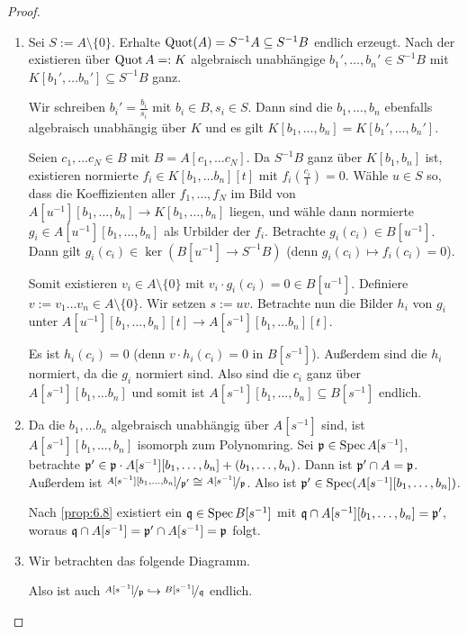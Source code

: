 \documentclass[12pt,a4paper]{scrartcl}
\theoremstyle{cplain}
\theoremstyle{cdef}
\begin{document}
\begin{proof}
	\leavevmode
	\begin{enumerate}[label=\ref{kor:7.17:\roman*}]
		\item Sei $S := A \setminus \{0\}$. Erhalte $\operatorname{Quot}(A)=S^{-1}A \subseteq S^{-1}B$ endlich erzeugt. Nach der  existieren über $\operatorname{Quot} A =: K$ algebraisch unabhängige $b_1',\dots , b_n' \in S^{-1}B$ mit $K[b_1', \dots b_n'] \subseteq S^{-1}B$ ganz. 
		
		Wir schreiben $b_i'=\frac{b_i}{s_i}$ mit $b_i \in B,s_i \in S$. Dann sind die $b_1, \dots , b_n$ ebenfalls algebraisch unabhängig über $K$ und es gilt $K[b_1, \dots , b_n] = K[b_1', \dots , b_n']$.
		
		Seien $c_1, \dots c_N \in B$ mit $B=A[c_1, \dots c_N]$. Da $S^{-1}B$ ganz über $K[b_1, b_n]$ ist, existieren normierte $f_i \in K[b_1, \dots b_n][t]$ mit $f_i(\frac{c_i}{1})=0$. Wähle $u \in S$ so, dass die Koeffizienten aller $f_1, \dots , f_N$ im Bild von $A[u^{-1}][b_1, \dots , b_n] \to K[b_1, \dots , b_n]$ liegen, und wähle dann normierte $g_i \in A[u^{-1}][b_1, \dots , b_n]$ als Urbilder der $f_i$. Betrachte $g_i(c_i) \in B[u^{-1}]$. Dann gilt $g_i(c_i) \in \ker(B[u^{-1}] \to S^{-1}B)$ (denn $g_i(c_i) \mapsto f_i(c_i)=0$). 
		
		Somit existieren $v_i \in A \setminus \{0\}$ mit $v_i \cdot g_i(c_i)=0 \in B[u^{-1}]$. Definiere $v := v_1 \dots v_n \in A \setminus \{0\}$. Wir setzen $s := uv$. Betrachte nun die Bilder $h_i$ von $g_i$ unter $A[u^{-1}][b_1, \dots , b_n][t] \to A[s^{-1}][b_1, \dots b_n][t]$.
		
		Es ist $h_i(c_i)=0$ (denn $v \cdot h_i(c_i) = 0$ in $B[s^{-1}]$). Außerdem sind die $h_i$ normiert, da die $g_i$ normiert sind. Also sind die $c_i$ ganz über $A[s^{-1}][b_1, \dots b_n]$ und somit ist $A[s^{-1}][b_1, \dots , b_n] \subseteq B[s^{-1}]$ endlich. 
		\item Da die $b_1, \dots b_n$ algebraisch unabhängig über $A[s^{-1}]$ sind, ist $A[s^{-1}][b_1, \dots , b_n]$ isomorph zum Polynomring. Sei $\mathfrak{p} \in \operatorname{Spec} A[s^{-1}]$, betrachte $\mathfrak{p}' \in \mathfrak{p} \cdot A[s^{-1}][b_1, \dots , b_n]+(b_1, \dots , b_n)$. Dann ist $\mathfrak{p}' \cap A = \mathfrak{p}$. Außerdem ist $\nicefrac{A[s^{-1}][b_1, \dots , b_n]}{\mathfrak{p}'} \cong \nicefrac{A[s^{-1}]}{\mathfrak{p}}$. Also ist $\mathfrak{p}' \in \operatorname{Spec} (A[s^{-1}][b_1, \dots , b_n])$.  
		
		Nach \cref{prop:6.8} existiert ein $\mathfrak{q} \in \operatorname{Spec} B[s^{-1}]$ mit $\mathfrak{q} \cap A[s^{-1}][b_1, \dots , b_n]=\mathfrak{p}'$, woraus $\mathfrak{q} \cap A[s^{-1}]=\mathfrak{p}' \cap A[s^{-1}]=\mathfrak{p}$ folgt.
		\item Wir betrachten das folgende Diagramm.
		\begin{center}
		\end{center}
		Also ist auch $\nicefrac{A[s^{-1}]}{\mathfrak{p}} \hookrightarrow \nicefrac{B[s^{-1}]}{\mathfrak{q}}$ endlich.
		

\end{enumerate}
\end{proof}
\end{document}
